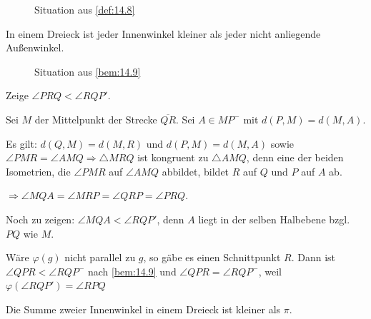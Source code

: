 \begin{figure}[ht]
    \centering
    \label{fig:def.14.8.0}
    \caption{Situation aus \cref{def:14.8}}
\end{figure}

\begin{bemerkung}\label{bem:14.9}%
    In einem Dreieck ist jeder Innenwinkel kleiner als jeder nicht 
    anliegende Außenwinkel.
\end{bemerkung}

\begin{figure}[htp]
    \centering
    
    \caption{Situation aus \cref{bem:14.9}}
    \label{fig:bem:14.9}
\end{figure}

\begin{beweis}
    Zeige $\angle PRQ < \angle RQP'$.

    Sei $M$ der Mittelpunkt der Strecke $\overline{QR}$. Sei
    $A \in MP^-$ mit $d(P,M) = d(M,A)$.

    Es gilt: $d(Q,M) = d(M,R)$ und $d(P,M) = d(M,A)$ sowie 
    $\angle PMR = \angle AMQ \Rightarrow \triangle MRQ$ ist
    kongruent zu $\triangle AMQ$, denn eine der beiden Isometrien, die
    $\angle PMR$ auf $\angle AMQ$ abbildet, bildet $R$ auf $Q$ und
    $P$ auf $A$ ab.

    $\Rightarrow \angle MQA = \angle MRP = \angle QRP = \angle PRQ$.

    Noch zu zeigen: $\angle MQA < \angle RQP'$, denn $A$ liegt in der
    selben Halbebene bzgl. $PQ$ wie $M$.
\end{beweis}

\begin{beweis}
    Wäre $\varphi(g)$ nicht parallel zu $g$, so gäbe es einen 
    Schnittpunkt $R$. Dann ist $\angle QPR < \angle RQP^-$ nach
    \cref{bem:14.9} und $\angle QPR = \angle RQP^-$, weil
    $\varphi(\angle RQP') = \angle RPQ$
\end{beweis}

\begin{folgerung}\label{folgerung:14.10}%
    Die Summe zweier Innenwinkel in einem Dreieck ist kleiner als $\pi$.
\end{folgerung}

